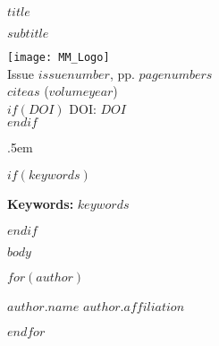 \documentclass[hidelinks,12pt,a4paper]{article}
\newcommand{\titlesize}{\fontsize{22.0}{20pt}\selectfont}
\begin{document}
\begin{sf}
{\raggedright %
\begin{minipage}[t]{120mm}
  \vskip 2.5pt%
{\raggedright\titlesize\textbf{$title$} \par \vspace*{5mm} \textbf{\large $subtitle$}}

    \end{minipage}\hspace{7mm}\begin{minipage}[t]{40.0mm}
\hbox{}\texttt{[image: MM\_Logo]}\\
\scriptsize{Issue $issuenumber$, pp. $pagenumbers$}\\ 
\scriptsize{$citeas$ ($volumeyear$)}\\
$if(DOI)$
\scriptsize{DOI: $DOI$}\\
$endif$
\end{minipage}

{\par\large%
      \vspace*{5mm}
      \lineskip .5em%

     \vskip 20pt%
         {\noindent\usebox\absbox\par}
         
 $if(keywords)$
    {\vspace{15pt}%
      {\noindent\normalsize \textbf{Keywords:} $keywords$ }\par}
      \vspace{6mm}
      \par%
$endif$    
 
 
 
  }}
\end{sf}



 \setlength{\parindent}{0em}

 $body$


$for(author)$
\begin{sf}
\noindent\large\textbf{$author.name$} \emph{\small $author.affiliation$} 
\end{sf}
 $endfor$
\end{document}
